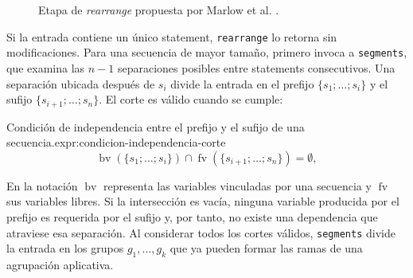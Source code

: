 \begin{figure}[ht]
\begin{minipage}{0.6\textwidth}
  \AdoBlockGap

  \AdoBlockGap

  \AdoBlockGap
  \end{minipage}
  \endgroup
  \captionsetup{skip=14pt}
  \caption{Etapa de \textit{rearrange} propuesta por Marlow et al. \cite[p.~95]{MarlowPJKM2016}.}
  \label{fig:rearrangement-marlow}
\end{figure}

Si la entrada contiene un único statement, \texttt{rearrange} lo retorna sin modificaciones. Para una secuencia de mayor tamaño, primero invoca a \texttt{segments}, que examina las $n-1$ separaciones posibles entre statements consecutivos. Una separación ubicada después de $s_i$ divide la entrada en el prefijo $\{s_1;\ldots;s_i\}$ y el sufijo $\{s_{i+1};\ldots;s_n\}$. El corte es válido cuando se cumple:

\begin{ReportExpression}{Condición de independencia entre el prefijo y el sufijo de una secuencia.}{expr:condicion-independencia-corte}
\[
\operatorname{bv}(\{s_1;\ldots;s_i\})
\cap
\operatorname{fv}(\{s_{i+1};\ldots;s_n\})
=\emptyset,
\]
\end{ReportExpression}

En la notación $\operatorname{bv}$ representa las variables vinculadas por una secuencia y $\operatorname{fv}$ sus variables libres. Si la intersección es vacía, ninguna variable producida por el prefijo es requerida por el sufijo y, por tanto, no existe una dependencia que atraviese esa separación. Al considerar todos los cortes válidos, \texttt{segments} divide la entrada en los grupos $g_1,\ldots,g_k$ que ya pueden formar las ramas de una agrupación aplicativa.

